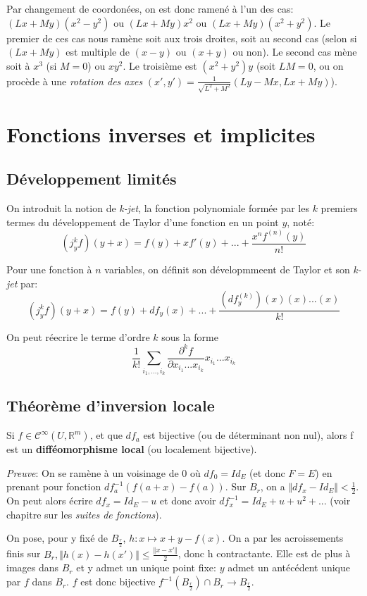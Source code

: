 \documentclass{article}
\begin{document}
Par changement de coordonées, on est donc ramené à l'un des cas: $(Lx+My)(x^2-y^2)$ ou $(Lx+My)x^2$ ou $(Lx+My)(x^2+y^2)$. Le premier de ces cas nous ramène soit aux trois droites, soit au second cas (selon si $(Lx+My)$ est multiple de $(x-y)$ ou $(x+y)$ ou non). Le second cas mène soit à $x^3$ (si $M=0$) ou $xy^2$. Le troisième est $(x^2+y^2)y$ (soit $LM=0$, ou on procède à une \textit{rotation des axes} $(x',y')=\frac{1}{\sqrt{L^2+M^2}}(Ly-Mx,Lx+My)$).

\section{Fonctions inverses et implicites}

\subsection{Développement limités}

On introduit la notion de \textit{k-jet}, la fonction polynomiale formée par les $k$ premiers termes du développement de Taylor d'une fonction en un point $y$, noté: $$(j^k_y f)(y+x) = f(y) + xf'(y)+...+\frac{x^n f^{(n)}(y)}{n!}$$

Pour une fonction à $n$ variables, on définit son dévelopmmeent de Taylor et son \textit{k-jet} par: $$(j^k_y f)(y+x) = f(y) + df_y(x)+...+\frac{(df^{(k)}_y)(x)(x)...(x)}{k!}$$

On peut réecrire le terme d'ordre $k$ sous la forme $$\frac{1}{k!}\sum_{i_1,...,i_k} \frac{\partial^k f}{\partial x_{i_1}...x_{i_k}} x_{i_1}...x_{i_k}$$

\subsection{Théorème d'inversion locale}

Si $f\in\mathcal{C}^{\infty}(U,\mathbb{R}^m)$, et que $df_a$ est bijective (ou de déterminant non nul), alors f est un \textbf{difféomorphisme local} (ou localement bijective).

\bigskip

\textit{Preuve}: On se ramène à un voisinage de 0 où $df_0=Id_E$ (et donc $F=E$) en prenant pour fonction $df_a^{-1}(f(a+x)-f(a))$. Sur $B_r$, on a $\Vert df_x-Id_E \Vert < \frac{1}{2}$. On peut alors écrire $df_x=Id_E-u$ et donc avoir $df_x^{-1}=Id_E+u+u^2+...$ (voir chapitre sur les \textit{suites de fonctions}).

On pose, pour y fixé de $B_{\frac{r}{2}}$, $h:x\mapsto x+y-f(x)$. On a par les acroissements finis sur $B_r, \Vert h(x) - h(x')\Vert\leq\frac{\Vert x-x' \Vert}{2}$, donc h contractante. Elle est de plus à images dans $B_r$ et y admet un unique point fixe: $y$ admet un antécédent unique par $f$ dans $B_r$. $f$ est donc bijective $f^{-1}(B_\frac{r}{2}) \cap B_r \to B_{\frac{r}{2}}$.
\end{document}
